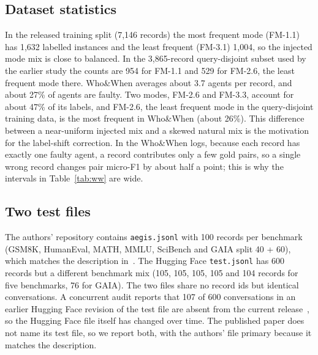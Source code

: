 \documentclass[conference]{IEEEtran}
\begin{document}
\subsection{Dataset statistics}
In the released training split (7,146 records) the most frequent mode (FM-1.1) has 1,632 labelled instances and the least frequent (FM-3.1) 1,004, so the injected mode mix is close to balanced. In the 3,865-record query-disjoint subset used by the earlier study the counts are 954 for FM-1.1 and 529 for FM-2.6, the least frequent mode there. Who\&When averages about 3.7 agents per record, and about 27\% of agents are faulty. Two modes, FM-2.6 and FM-3.3, account for about 47\% of its labels, and FM-2.6, the least frequent mode in the query-disjoint training data, is the most frequent in Who\&When (about 26\%). This difference between a near-uniform injected mix and a skewed natural mix is the motivation for the label-shift correction. In the Who\&When logs, because each record has exactly one faulty agent, a record contributes only a few gold pairs, so a single wrong record changes pair micro-F1 by about half a point; this is why the intervals in Table~\ref{tab:ww} are wide.

\subsection{Two test files}
The authors' repository contains \texttt{aegis.jsonl} with 100 records per benchmark (GSM8K, HumanEval, MATH, MMLU, SciBench and GAIA split 40 + 60), which matches the description in~\cite{aegis}. The Hugging Face \texttt{test.jsonl} has 600 records but a different benchmark mix (105, 105, 105, 105 and 104 records for five benchmarks, 76 for GAIA). The two files share no record ids but \sharedConv{} identical conversations. A concurrent audit reports that 107 of 600 conversations in an earlier Hugging Face revision of the test file are absent from the current release~\cite{audit2}, so the Hugging Face file itself has changed over time. The published paper does not name its test file, so we report both, with the authors' file primary because it matches the description.
\end{document}
